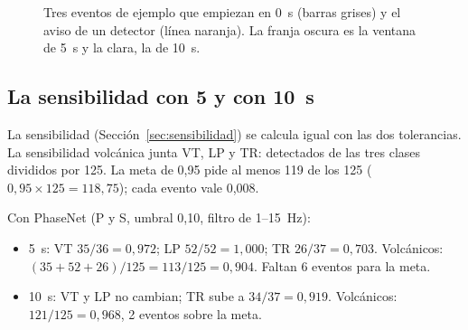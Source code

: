 \documentclass[11pt,a4paper,oneside,spanish,oldfontcommands]{memoir}
\begin{document}
\begin{figure}[H]
\centering
{}
\caption{Tres eventos de ejemplo que empiezan en 0~s (barras grises) y el aviso de un detector (línea naranja). La franja oscura es la ventana de 5~s y la clara, la de 10~s.}\label{fig:tolerancia}
\end{figure}

\subsection*{La sensibilidad con 5 y con 10~s}

La sensibilidad (Sección~\ref{sec:sensibilidad}) se calcula igual con las dos tolerancias. La
sensibilidad volcánica junta VT, LP y TR: detectados de las tres clases
divididos por 125. La meta de 0,95 pide al menos 119 de los 125
($0{,}95 \times 125 = 118{,}75$); cada evento vale 0,008.

Con PhaseNet (P y S, umbral 0,10, filtro de 1--15~Hz):

\begin{itemize}
\item 5~s: VT $35/36 = 0{,}972$; LP $52/52 = 1{,}000$; TR
  $26/37 = 0{,}703$. Volcánicos: $(35 + 52 + 26)/125 = 113/125 = 0{,}904$.
  Faltan 6 eventos para la meta.
\item 10~s: VT y LP no cambian; TR sube a $34/37 = 0{,}919$.
  Volcánicos: $121/125 = 0{,}968$, 2 eventos sobre la meta.
\end{itemize}
\end{document}
